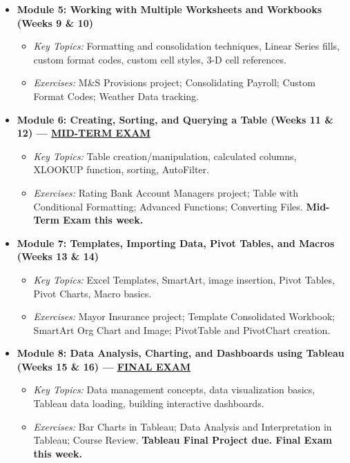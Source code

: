 \documentclass[11pt,a4paper]{article}
\begin{document}
\begin{itemize}[leftmargin=*]
    \item \textbf{Module 5: Working with Multiple Worksheets and Workbooks (Weeks 9 \& 10)}
    \begin{itemize}
        \item \textit{Key Topics:} Formatting and consolidation techniques, Linear Series fills, custom format codes, custom cell styles, 3-D cell references.
        \item \textit{Exercises:} M\&S Provisions project; Consolidating Payroll; Custom Format Codes; Weather Data tracking.
    \end{itemize}

    \item \textbf{Module 6: Creating, Sorting, and Querying a Table (Weeks 11 \& 12) --- \underline{MID-TERM EXAM}}
    \begin{itemize}
        \item \textit{Key Topics:} Table creation/manipulation, calculated columns, XLOOKUP function, sorting, AutoFilter.
        \item \textit{Exercises:} Rating Bank Account Managers project; Table with Conditional Formatting; Advanced Functions; Converting Files. \textbf{Mid-Term Exam this week.}
    \end{itemize}

    \item \textbf{Module 7: Templates, Importing Data, Pivot Tables, and Macros (Weeks 13 \& 14)}
    \begin{itemize}
        \item \textit{Key Topics:} Excel Templates, SmartArt, image insertion, Pivot Tables, Pivot Charts, Macro basics.
        \item \textit{Exercises:} Mayor Insurance project; Template Consolidated Workbook; SmartArt Org Chart and Image; PivotTable and PivotChart creation.
    \end{itemize}

    \item \textbf{Module 8: Data Analysis, Charting, and Dashboards using Tableau (Weeks 15 \& 16) --- \underline{FINAL EXAM}}
    \begin{itemize}
        \item \textit{Key Topics:} Data management concepts, data visualization basics, Tableau data loading, building interactive dashboards.
        \item \textit{Exercises:} Bar Charts in Tableau; Data Analysis and Interpretation in Tableau; Course Review. \textbf{Tableau Final Project due. Final Exam this week.}
    \end{itemize}
\end{itemize}
\end{document}
